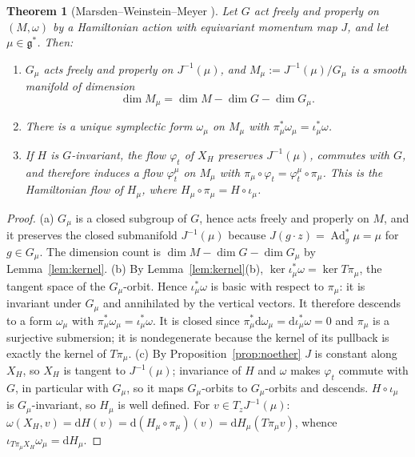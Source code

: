 \documentclass[11pt,a4paper]{article}
\numberwithin{equation}{section}
\theoremstyle{plain}
\newtheorem{theorem}{Theorem}[section]
\theoremstyle{definition}
\theoremstyle{remark}
\newcommand{\frakg}{\mathfrak{g}}
\newcommand{\Ad}{\operatorname{Ad}}
\newcommand{\dd}{\mathrm{d}}
\begin{document}
\begin{theorem}[Marsden--Weinstein--Meyer \cite{mw1974,meyer1973}]\label{thm:MWM}
Let $G$ act freely and properly on $(M,\omega)$ by a Hamiltonian action with equivariant momentum map $J$, and let $\mu\in\frakg^*$. Then:
\begin{enumerate}[label=(\alph*)]
\item $G_\mu$ acts freely and properly on $J^{-1}(\mu)$, and $M_\mu:=J^{-1}(\mu)/G_\mu$ is a smooth manifold of dimension
\begin{equation}\label{eq:dimMmu}
\dim M_\mu=\dim M-\dim G-\dim G_\mu .
\end{equation}
\item There is a unique symplectic form $\omega_\mu$ on $M_\mu$ with $\pi_\mu^*\omega_\mu=\iota_\mu^*\omega$.
\item If $H$ is $G$-invariant, the flow $\varphi_t$ of $X_H$ preserves $J^{-1}(\mu)$, commutes with $G$, and therefore induces a flow $\varphi^\mu_t$ on $M_\mu$ with $\pi_\mu\circ\varphi_t=\varphi^\mu_t\circ\pi_\mu$. This is the Hamiltonian flow of $H_\mu$, where $H_\mu\circ\pi_\mu=H\circ\iota_\mu$.
\end{enumerate}
\end{theorem}
\begin{proof}
(a) $G_\mu$ is a closed subgroup of $G$, hence acts freely and properly on $M$, and it preserves the closed submanifold $J^{-1}(\mu)$ because $J(g\cdot z)=\Ad^*_g\mu=\mu$ for $g\in G_\mu$. The dimension count is $\dim M-\dim G-\dim G_\mu$ by Lemma~\ref{lem:kernel}.
(b) By Lemma~\ref{lem:kernel}(b), $\ker\iota_\mu^*\omega=\ker T\pi_\mu$, the tangent space of the $G_\mu$-orbit. Hence $\iota_\mu^*\omega$ is basic with respect to $\pi_\mu$: it is invariant under $G_\mu$ and annihilated by the vertical vectors. It therefore descends to a form $\omega_\mu$ with $\pi_\mu^*\omega_\mu=\iota_\mu^*\omega$. It is closed since $\pi_\mu^*\dd\omega_\mu=\dd\iota_\mu^*\omega=0$ and $\pi_\mu$ is a surjective submersion; it is nondegenerate because the kernel of its pullback is exactly the kernel of $T\pi_\mu$.
(c) By Proposition~\ref{prop:noether} $J$ is constant along $X_H$, so $X_H$ is tangent to $J^{-1}(\mu)$; invariance of $H$ and $\omega$ makes $\varphi_t$ commute with $G$, in particular with $G_\mu$, so it maps $G_\mu$-orbits to $G_\mu$-orbits and descends. $H\circ\iota_\mu$ is $G_\mu$-invariant, so $H_\mu$ is well defined. For $v\in T_zJ^{-1}(\mu)$: $\omega(X_H,v)=\dd H(v)=\dd(H_\mu\circ\pi_\mu)(v)=\dd H_\mu(T\pi_\mu v)$, whence $\iota_{T\pi_\mu X_H}\omega_\mu=\dd H_\mu$.
\end{proof}
\end{document}
